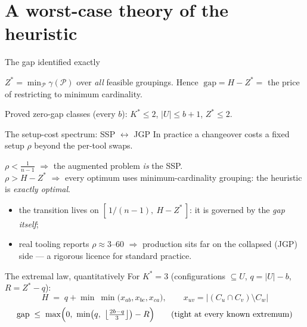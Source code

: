 \documentclass[10pt]{beamer}
\newcommand{\U}{U}\newcommand{\Kst}{K^{\ast}}\newcommand{\Zst}{Z^{\ast}}
\begin{document}
\section{A worst-case theory of the heuristic}
\begin{frame}{The gap identified exactly}
\begin{theorem}
$\displaystyle \Zst=\min_{\mathcal P}\gamma(\mathcal P)$ over \emph{all}
feasible groupings. Hence
$\;\mathrm{gap}=H-\Zst=$ the price of restricting to minimum cardinality.
\end{theorem}
\vspace{1mm}
Proved zero-gap classes (every $b$): \quad
$\Kst\le2$, \quad $|\U|\le b+1$, \quad $\Zst\le2$.
\end{frame}

\begin{frame}{The setup-cost spectrum: SSP $\longleftrightarrow$ JGP}
In practice a changeover costs a fixed setup $\rho$ beyond the per-tool swaps.
\begin{theorem}
$\rho<\tfrac{1}{n-1}$ $\Rightarrow$ the augmented problem \emph{is} the SSP.\\
$\rho>H-\Zst$ $\Rightarrow$ every optimum uses minimum-cardinality grouping:
the heuristic is \emph{exactly optimal}.
\end{theorem}
\pause
\begin{itemize}
  \item the transition lives on $[\,1/(n-1),\ H-\Zst\,]$: it is governed by
        the \emph{gap itself};
  \item real tooling reports $\rho\approx3$--$60$ $\Rightarrow$ production
        sits far on the collapsed (JGP) side --- a rigorous licence for
        standard practice.
\end{itemize}
\end{frame}

\begin{frame}{The extremal law, quantitatively}
For $\Kst=3$ (configurations $\subseteq\U$, $q=|\U|-b$, $R=\Zst-q$):
\[
  H \;=\; q+\min\ \min\bigl(x_{ab},x_{bc},x_{ca}\bigr),
  \qquad x_{uv}=\bigl|(C_u\cap C_v)\setminus C_w\bigr|
\]
\[
  \mathrm{gap}\;\le\;\max\Bigl(0,\ \min\bigl(q,\ \bigl\lfloor\tfrac{2b-q}{3}\bigr\rfloor\bigr)-R\Bigr)
  \qquad\text{(tight at every known extremum)}
\]
\end{frame}
\end{document}
